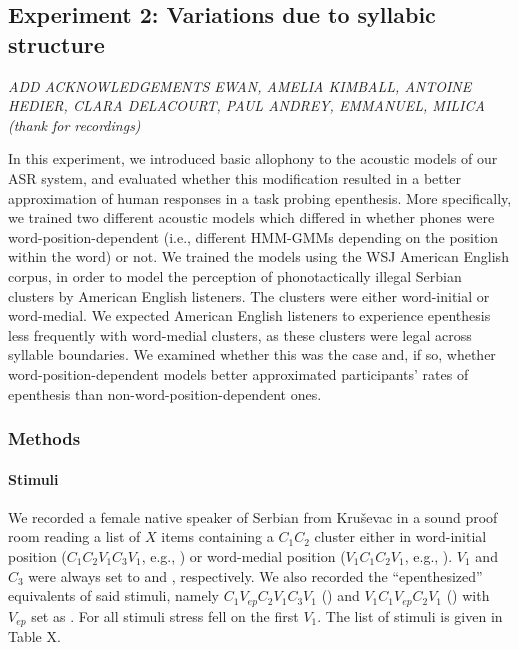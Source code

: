 {%
\subsection{Experiment 2: Variations due to syllabic structure}
\small{\textit{{\color{red}ADD ACKNOWLEDGEMENTS EWAN, AMELIA KIMBALL, ANTOINE HEDIER, CLARA DELACOURT, PAUL ANDREY, EMMANUEL, MILICA (thank for recordings)}}}

In this experiment, we introduced basic allophony to the acoustic models of our ASR system, and evaluated whether this modification resulted in a better approximation of human responses in a task probing epenthesis. More specifically, we trained two different acoustic models which differed in whether phones were word-position-dependent (i.e., different HMM-GMMs depending on the position within the word) or not. We trained the models using the WSJ American English corpus, in order to model the perception of phonotactically illegal Serbian clusters by American English listeners. The clusters were either word-initial or word-medial. We expected American English listeners to experience epenthesis less frequently with word-medial clusters, as these clusters were legal across syllable boundaries. We examined whether this was the case and, if so, whether word-position-dependent models better approximated participants' rates of epenthesis than non-word-position-dependent ones.         

\subsubsection{Methods}
\paragraph{Stimuli}
We recorded a female native speaker of Serbian from Kruševac in a sound proof room reading a list of {\color{red}$X$} items containing a $C_{1}C_{2}$ cluster either in word-initial position ($C_{1}C_{2}V_{1}C_{3}V_{1}$, e.g., ) or word-medial position ($V_{1}C_{1}C_{2}V_{1}$, e.g., ). $V_{1}$ and $C_{3}$ were always set to  and , respectively. 
We also recorded the ``epenthesized'' equivalents of said stimuli, namely $C_{1}V_{ep}C_{2}V_{1}C_{3}V_{1}$ () and $V_{1}C_{1}V_{ep}C_{2}V_{1}$ () with $V_{ep}$ set as \textipa{[@]}.
For all stimuli stress fell on the first $V_{1}$.
{\color{red}The list of stimuli is given in Table X.}

}
